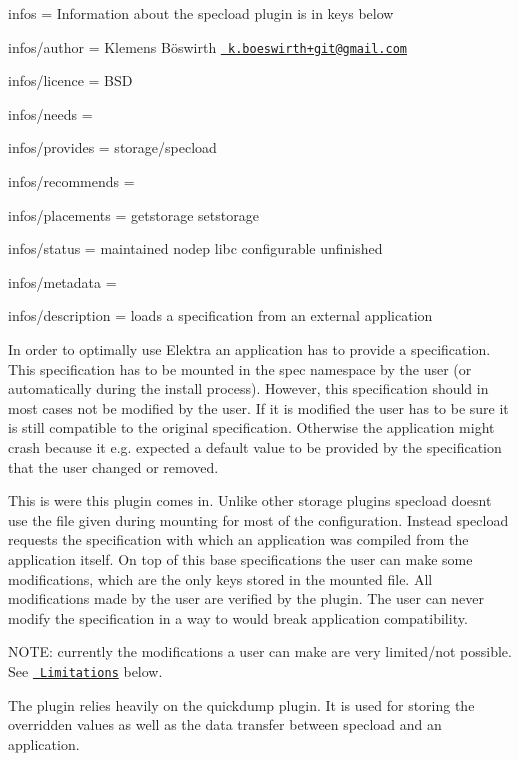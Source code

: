
\begin{DoxyItemize}
\item infos = Information about the specload plugin is in keys below
\item infos/author = Klemens Böswirth \href{mailto:k.boeswirth+git@gmail.com}{\texttt{ k.\+boeswirth+git@gmail.\+com}}
\item infos/licence = B\+SD
\item infos/needs =
\item infos/provides = storage/specload
\item infos/recommends =
\item infos/placements = getstorage setstorage
\item infos/status = maintained nodep libc configurable unfinished
\item infos/metadata =
\item infos/description = loads a specification from an external application
\end{DoxyItemize}

In order to optimally use Elektra an application has to provide a specification. This specification has to be mounted in the {\ttfamily spec} namespace by the user (or automatically during the install process). However, this specification should in most cases not be modified by the user. If it is modified the user has to be sure it is still compatible to the original specification. Otherwise the application might crash because it e.\+g. expected a default value to be provided by the specification that the user changed or removed.

This is were this plugin comes in. Unlike other storage plugins {\ttfamily specload} doesn\textquotesingle{}t use the file given during mounting for most of the configuration. Instead {\ttfamily specload} requests the specification with which an application was compiled from the application itself. On top of this base specifications the user can make some modifications, which are the only keys stored in the mounted file. All modifications made by the user are verified by the plugin. The user can never modify the specification in a way to would break application compatibility.

N\+O\+TE\+: currently the modifications a user can make are very limited/not possible. See \href{\#limitations}{\texttt{ Limitations}} below.

The plugin relies heavily on the {\ttfamily quickdump} plugin. It is used for storing the overridden values as well as the data transfer between {\ttfamily specload} and an application.

